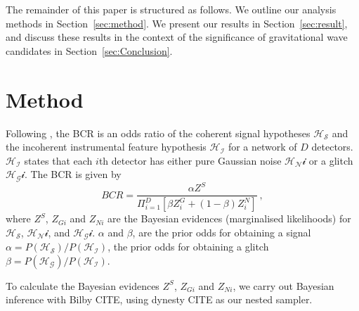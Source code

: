 \documentclass[%
 reprint,
 amsmath,amssymb,
 aps,
]{revtex4}
\newcommand{\bilby}{{\sc Bilby}\xspace}
\newcommand{\dynesty}{{\sc dynesty}\xspace}
\newcommand{\bcr}{{\sc BCR}\xspace}
\begin{document}
The remainder of this paper is structured as follows. We outline our analysis methods in Section~\ref{sec:method}. We present our results in Section~\ref{sec:result}, and discuss these results in the context of the significance of gravitational wave candidates in Section~\ref{sec:Conclusion}.


\section{Method\label{sec:method}}


Following \citet{bcr_paper}, the \bcr is an odds ratio of the coherent signal hypotheses $\mathcal{H_S}$ and the incoherent instrumental feature hypothesis $\mathcal{H_I}$ for a network of $D$ detectors. $\mathcal{H_I}$ states that each $i$th detector has either pure Gaussian noise $\mathcal{H_Ni}$ or a glitch $\mathcal{H_Gi}$. The \bcr is given by
\begin{equation}
BCR = \frac{\alpha Z^S}{\Pi^D_{i=1}[\beta Z^G_i + (1-\beta)Z^N_i]}\ ,
\end{equation}
where $Z^S$, $Z_{Gi}$ and $Z_{Ni}$ are the Bayesian evidences (marginalised likelihoods) for $\mathcal{H_S}$, $\mathcal{H_Ni}$, and $\mathcal{H_Gi}$. $\alpha$ and $\beta$, are the prior odds for obtaining a signal $\alpha=P(\mathcal{H_S})/P(\mathcal{H_I})$, the prior odds for obtaining a glitch $\beta=P(\mathcal{H_G})/P(\mathcal{H_I})$.
 
To calculate the Bayesian evidences $Z^S$, $Z_{Gi}$ and $Z_{Ni}$, we carry out Bayesian inference with \bilby CITE, using \dynesty CITE as our nested sampler. 



\end{document}
